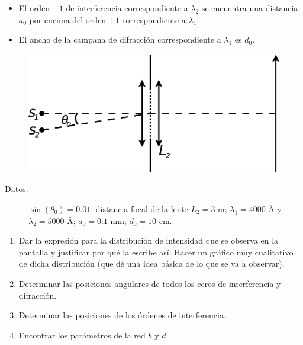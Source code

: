 \documentclass[11pt,spanish]{article}
\begin{document}
\begin{enumerate}
    \begin{itemize}
        \item El orden $-1$ de interferencia correspondiente a $\lambda_{2}$ se
        encuentra una distancia $a_{0}$ por encima del orden $+1$ correspondiente
        a $\lambda_{1}$. 
        
        \item El ancho de la campana de difracción correspondiente a $\lambda_{1}$
        es $d_{0}$.
    \end{itemize}
    
    \begin{figure}[H]
        \centering{}
        \includegraphics[clip,scale=0.3]{figs/ej5-43}
    \end{figure}
    
    \begin{description}
        \item [{Datos:}] $\sin(\theta_{0})=0.01$; distancia focal de la lente
        $L_{2}=3$ m; $\lambda_{1}=4000$ Å y $\lambda_{2}=5000$ Å; $a_{0}=0.1$
        mm; $d_{0}=10$ cm.
    \end{description}
    
    \begin{enumerate}
        \item Dar la expresión para la distribución de intensidad que se observa
        en la pantalla y justificar por qué la escribe así. Hacer un gráfico
        muy cualitativo de dicha distribución (que dé una idea básica de lo
        que se va a observar).

        \item Determinar las posiciones angulares de todos los ceros de 
        interferencia y difracción.

        \item Determinar las posiciones de los órdenes de interferencia.

        \item Encontrar los parámetros de la red $b$ y $d$.


\end{enumerate}
\end{enumerate}
\end{document}
